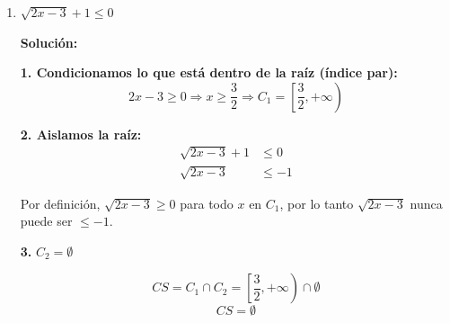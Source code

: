 \documentclass[12pt]{article}
\newcommand{\solucion}{%
    \vspace{0.8em}%
    \textbf{Solución:}%
}
\begin{document}
\begin{enumerate}[label=\alph*.-]
    Como ambos lados son no negativos (dentro de $C_1$):
    \begin{align*}
    5^2 &\geq \left(\sqrt{3x+1}\right)^2 \\[0.3em]
    25 &\geq 3x + 1 \\[0.3em]
    24 &\geq 3x \\[0.3em]
    x &\leq 8 \Rightarrow C_2 = (-\infty, 8]
    \end{align*}

    \textbf{3.} $CS = C_1 \cap C_2 = \left[-\dfrac{1}{3}, +\infty\right) \cap (-\infty, 8]$
    \[
    \boxed{CS = \left[-\dfrac{1}{3},\ 8\right]}
    \]

    \textbf{Representación gráfica:}

    \begin{center}
    \end{center}

    \newpage
    \item $\sqrt{2x-3} + 1 \leq 0$

    \solucion

    \textbf{1. Condicionamos lo que está dentro de la raíz (índice par):}
    \[
    2x - 3 \geq 0 \Rightarrow x \geq \dfrac{3}{2} \Rightarrow C_1 = \left[\dfrac{3}{2}, +\infty\right)
    \]

    \textbf{2. Aislamos la raíz:}
    \begin{align*}
    \sqrt{2x-3} + 1 &\leq 0 \\[0.3em]
    \sqrt{2x-3} &\leq -1
    \end{align*}

    Por definición, $\sqrt{2x-3} \geq 0$ para todo $x$ en $C_1$, por lo tanto $\sqrt{2x-3}$ nunca puede ser $\leq -1$.

    \textbf{3.} $C_2 = \emptyset$

    \[
    CS = C_1 \cap C_2 = \left[\dfrac{3}{2}, +\infty\right) \cap \emptyset
    \]
    \[
    \boxed{CS = \emptyset}
    \]

\end{enumerate}
\end{document}

